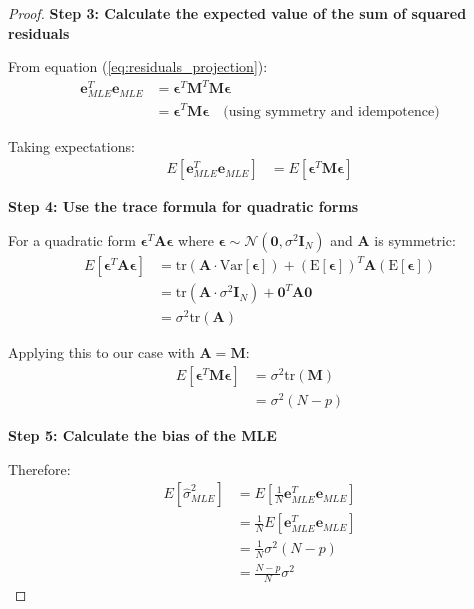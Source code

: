 \documentclass{article}
\begin{document}
\begin{proof}
\textbf{Step 3: Calculate the expected value of the sum of squared residuals}

From equation (\ref{eq:residuals_projection}):
\begin{align}
\mathbf{e}_{MLE}^T\mathbf{e}_{MLE} &= \boldsymbol{\epsilon}^T\mathbf{M}^T\mathbf{M}\boldsymbol{\epsilon} \nonumber\\
&= \boldsymbol{\epsilon}^T\mathbf{M}\boldsymbol{\epsilon} \quad \text{(using symmetry and idempotence)} \label{eq:sse_quadratic}
\end{align}

Taking expectations:
\begin{align}
E[\mathbf{e}_{MLE}^T\mathbf{e}_{MLE}] &= E[\boldsymbol{\epsilon}^T\mathbf{M}\boldsymbol{\epsilon}] \label{eq:expectation_sse}
\end{align}

\textbf{Step 4: Use the trace formula for quadratic forms}

For a quadratic form $\boldsymbol{\epsilon}^T\mathbf{A}\boldsymbol{\epsilon}$ where $\boldsymbol{\epsilon} \sim \mathcal{N}(\mathbf{0}, \sigma^2\mathbf{I}_N)$ and $\mathbf{A}$ is symmetric:
\begin{align}
E[\boldsymbol{\epsilon}^T\mathbf{A}\boldsymbol{\epsilon}] &= \text{tr}(\mathbf{A} \cdot \text{Var}[\boldsymbol{\epsilon}]) + (\text{E}[\boldsymbol{\epsilon}])^T\mathbf{A}(\text{E}[\boldsymbol{\epsilon}]) \nonumber\\
&= \text{tr}(\mathbf{A} \cdot \sigma^2\mathbf{I}_N) + \mathbf{0}^T\mathbf{A}\mathbf{0} \nonumber\\
&= \sigma^2\text{tr}(\mathbf{A}) \label{eq:quadratic_expectation}
\end{align}

Applying this to our case with $\mathbf{A} = \mathbf{M}$:
\begin{align}
E[\boldsymbol{\epsilon}^T\mathbf{M}\boldsymbol{\epsilon}] &= \sigma^2\text{tr}(\mathbf{M}) \nonumber\\
&= \sigma^2(N - p) \label{eq:expected_sse}
\end{align}

\textbf{Step 5: Calculate the bias of the MLE}

Therefore:
\begin{align}
E[\hat{\sigma}^2_{MLE}] &= E\left[\frac{1}{N}\mathbf{e}_{MLE}^T\mathbf{e}_{MLE}\right] \nonumber\\
&= \frac{1}{N}E[\mathbf{e}_{MLE}^T\mathbf{e}_{MLE}] \nonumber\\
&= \frac{1}{N}\sigma^2(N - p) \nonumber\\
&= \frac{N-p}{N}\sigma^2 \label{eq:bias_mle}
\end{align}


\end{proof}
\end{document}
